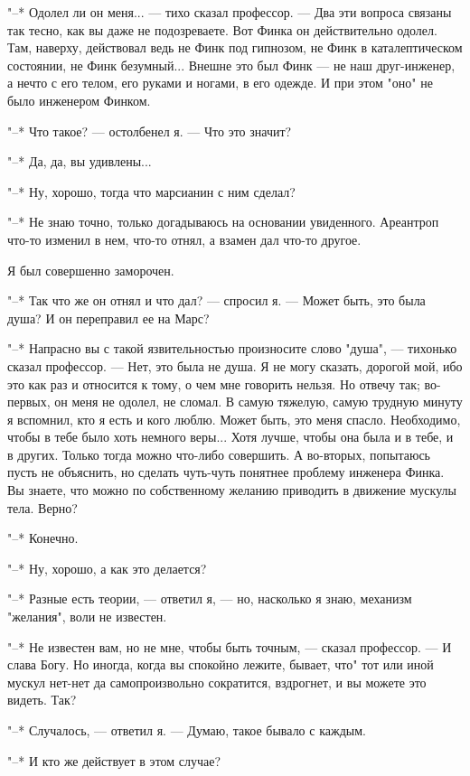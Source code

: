 "--* Одолел ли он меня... --- тихо  сказал  профессор.  ---  Два  эти  вопроса
связаны так тесно, как вы даже не подозреваете. Вот Финка он действительно
одолел. Там, наверху, действовал ведь не Финк  под  гипнозом,  не  Финк  в
каталептическом состоянии, не Финк безумный... Внешне это был  Финк  ---  не
наш друг-инженер, а нечто с его телом, его руками и ногами, в его  одежде.
И при этом "оно" не было инженером Финком.

"--* Что такое? --- остолбенел я. --- Что это значит?

"--* Да, да, вы удивлены...

"--* Ну, хорошо, тогда что марсианин с ним сделал?

"--* Не знаю точно, только догадываюсь на основании увиденного.  Ареантроп
что-то изменил в нем, что-то отнял, а взамен дал что-то другое.

Я был совершенно заморочен.

"--* Так что же он отнял и что дал? --- спросил я. --- Может  быть,  это  была
душа? И он переправил ее на Марс?

"--* Напрасно вы  с  такой  язвительностью  произносите  слово  "душа",  ---
тихонько сказал профессор. --- Нет, это была не душа.  Я  не  могу  сказать,
дорогой мой, ибо это как раз и  относится  к  тому,  о  чем  мне  говорить
нельзя. Но отвечу так; во-первых, он меня не одолел, не  сломал.  В  самую
тяжелую, самую трудную минуту я вспомнил, кто я есть и кого  люблю.  Может
быть, это меня спасло. Необходимо, чтобы в тебе было хоть немного  веры...
Хотя лучше, чтобы она была и в  тебе,  и  в  других.  Только  тогда  можно
что-либо совершить. А во-вторых, попытаюсь пусть не объяснить, но  сделать
чуть-чуть понятнее проблему  инженера  Финка.  Вы  знаете,  что  можно  по
собственному желанию приводить в движение мускулы тела. Верно?

"--* Конечно.

"--* Ну, хорошо, а как это делается?

"--* Разные есть теории, --- ответил я, --- но,  насколько  я  знаю,  механизм
"желания", воли не известен.

"--* Не известен вам, но не мне, чтобы быть точным, --- сказал профессор.  ---
И слава Богу. Но иногда, когда вы спокойно лежите, бывает,  что"  тот  или
иной мускул нет-нет да самопроизвольно сократится, вздрогнет, и вы  можете
это видеть. Так?

"--* Случалось, --- ответил я. --- Думаю, такое бывало с каждым.

"--* И кто же действует в этом случае?

